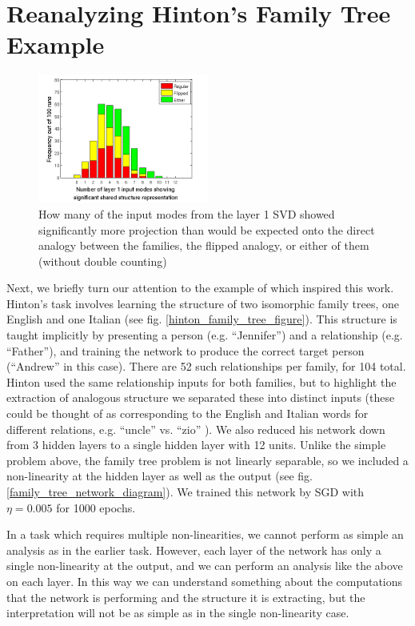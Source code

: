 \documentclass[10pt,letterpaper]{article}
\begin{document}
\section{Reanalyzing Hinton's Family Tree Example}
\begin{figure}
\centering
\includegraphics[width=0.5\textwidth]{figures/ft_input_mode_significance_hist.png}
\caption{How many of the input modes from the layer 1 SVD showed significantly more projection than would be expected onto the direct analogy between the families, the flipped analogy, or either of them (without double counting)}
\label{ft_input_mode_sig_hist}
\end{figure}
Next, we briefly turn our attention to the example of \citet{Hinton1986} which inspired this work. Hinton's task involves learning the structure of two isomorphic family trees, one English and one Italian (see fig. \ref{hinton_family_tree_figure}). This structure is taught implicitly by presenting a person (e.g. ``Jennifer'') and a relationship (e.g. ``Father''), and training the network to produce the correct target person (``Andrew'' in this case). There are 52 such relationships per family, for 104 total. Hinton used the same relationship inputs for both families, but to highlight the extraction of analogous structure we separated these into distinct inputs (these could be thought of as corresponding to the English and Italian words for different relations, e.g. ``uncle'' vs. ``zio'' ). We also reduced his network down from 3 hidden layers to a single hidden layer with 12 units. Unlike the simple problem above, the family tree problem is not linearly separable, so we included a non-linearity at the hidden layer as well as the output (see fig. \ref{family_tree_network_diagram}). We trained this network by SGD with \(\eta = 0.005\) for 1000 epochs. \par 
In a task which requires multiple non-linearities, we cannot perform as simple an analysis as in the earlier task. However, each layer of the network has only a single non-linearity at the output, and we can perform an analysis like the above on each layer. In this way we can understand something about the computations that the network is performing and the structure it is extracting, but the interpretation will not be as simple as in the single non-linearity case. \par
\end{document}

